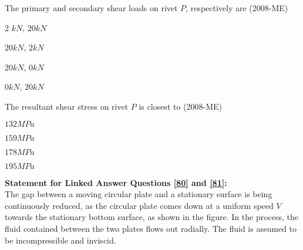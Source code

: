  \item The primary and secondary shear loads on rivet $P$,
 respectively are \label{78} \hfill(2008-ME)
 \begin{enumerate}
     \begin{multicols}{2}
         \item 2 $kN$, $20kN$
         \item $20kN$, $2kN$
          \item $20kN$, $0kN$
           \item $0kN$, $20kN$
     \end{multicols}
 \end{enumerate}
 \item The resultant shear stress on rivet $P$
 is closest to \label{79} \hfill(2008-ME)
 \begin{enumerate}
     \begin{multicols}{4}
         \item $132MPa$
         \item $159MPa$
         \item $178MPa$
         \item $195MPa$
     \end{multicols}
 \end{enumerate}
\textbf{Statement for Linked Answer Questions \ref{80} and \ref{81}:} \\
The gap between a moving circular plate and a stationary surface is being continuously reduced, as the circular plate comes down at a uniform speed $V$
 towards the stationary bottom surface, as shown in the figure. In the process, the fluid contained between the two plates flows out radially. The fluid is assumed to be incompressible and inviscid. 
